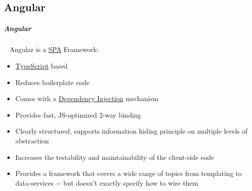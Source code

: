 \documentclass[11pt,twoside,landscape]{article}
\begin{document}
\begin{multicols}{3}
\section{Angular}
\label{sec:orge73d070}
\subparagraph{Angular} \
\label{sec:org179793c}
Angular is a \href{../../../roam/20231228102611-what_is_a_single_page_application.org}{SPA} Framework:
\begin{itemize}
\item \href{../../../roam/20240108134405-typescript.org}{TypeScript} based
\item Reduces boilerplate code
\item Comes with a \href{../../../roam/20200904154006-dependency_injection.org}{Dependency Injection} mechanism
\item Provides fast, JS-optimized 2-way binding
\item Clearly structured, supports information hiding principle on multiple levels of abstraction
\item Increases the testability and maintainability of the client-side code
\item Provides a framework that covers a wide range of topics from templating to data-services
− but doesn’t exactly specify how to wire them
\end{itemize}


\end{multicols}
\end{document}
